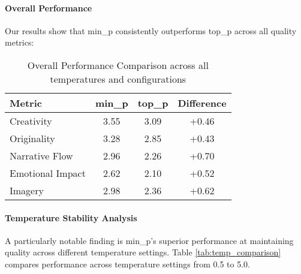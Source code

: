 \documentclass{article}
\begin{document}
\paragraph{Overall Performance}
Our results show that min\_p consistently outperforms top\_p across all quality metrics:

\begin{table}[htbp]
\centering
\begin{tabular}{l|ccc}
\hline
\textbf{Metric} & \textbf{min\_p} & \textbf{top\_p} & \textbf{Difference} \\
\hline
Creativity & 3.55 & 3.09 & +0.46 \\
Originality & 3.28 & 2.85 & +0.43 \\
Narrative Flow & 2.96 & 2.26 & +0.70 \\
Emotional Impact & 2.62 & 2.10 & +0.52 \\
Imagery & 2.98 & 2.36 & +0.62 \\
\hline
\end{tabular}
\caption{Overall Performance Comparison across all temperatures and configurations}
\end{table}

\paragraph{Temperature Stability Analysis}
A particularly notable finding is min\_p's superior performance at maintaining quality across different temperature settings. Table \ref{tab:temp_comparison} compares performance across temperature settings from 0.5 to 5.0.
\end{document}
